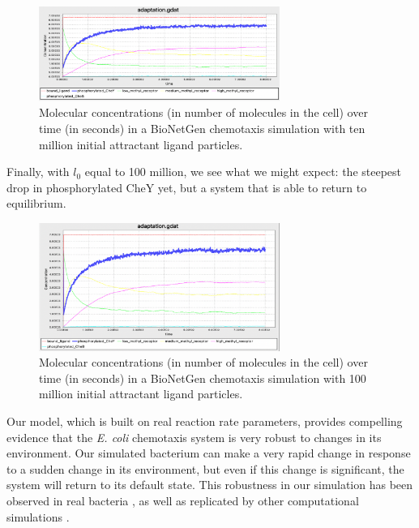 \begin{figure}[h]
\centering
\mySfFamily
\includegraphics[width = 0.7\textwidth]{../images/chemotaxis_tutorial_oneadd1e7.png}
\caption{Molecular concentrations (in number of molecules in the cell) over time (in seconds) in a BioNetGen chemotaxis simulation with ten million initial attractant ligand particles.}
\label{fig:chemotaxis_tutorial_oneadd1e7}
\end{figure}

Finally, with $l_0$ equal to 100 million, we see what we might expect: the steepest drop in phosphorylated CheY yet, but a system that is able to return to equilibrium.

\begin{figure}[h]
\centering
\mySfFamily
\includegraphics[width = 0.7\textwidth]{../images/chemotaxis_tutorial_oneadd1e8.png}
\caption{Molecular concentrations (in number of molecules in the cell) over time (in seconds) in a BioNetGen chemotaxis simulation with 100 million initial attractant ligand particles.}
\label{fig:chemotaxis_tutorial_oneadd1e8}
\end{figure}

Our model, which is built on real reaction rate parameters, provides compelling evidence that the \textit{E. coli} chemotaxis system is very robust to changes in its environment. Our simulated bacterium can make a very rapid change in response to a sudden change in its environment, but even if this change is significant, the system will return to its default state. This robustness in our simulation has been observed in real bacteria \citep{Shimizu_2005, Krembel_2015}, as well as replicated by other computational simulations \citep{Bray_1993}.

